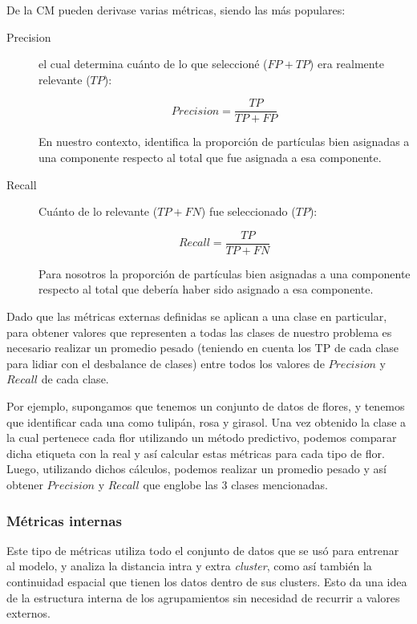 De la \gls{CM} pueden derivase varias métricas, siendo las más populares:

\begin{description}
    \item [Precision] el cual determina cuánto de lo que seleccioné ($FP + TP$) era realmente relevante ($TP$):

    $$Precision = \frac{TP}{TP + FP}$$

    En nuestro contexto, identifica la proporción de partículas bien asignadas a una componente respecto al total que fue asignada a esa componente. 

    \item [Recall] Cuánto de lo relevante ($TP + FN$) fue seleccionado ($TP$):

    $$Recall = \frac{TP}{TP + FN}$$

    Para nosotros la proporción de partículas bien asignadas a una componente respecto al total que debería haber sido asignado a esa componente. 

\end{description}

Dado que las métricas externas definidas se aplican a una clase en particular, para obtener valores que representen a todas las clases de nuestro problema es necesario realizar un promedio pesado (teniendo en cuenta los \gls{TP} de cada clase para lidiar con el desbalance de clases) entre todos los valores de $Precision$ y $Recall$ de cada clase.

Por ejemplo, supongamos que tenemos un conjunto de datos de flores, y tenemos que identificar cada una como tulipán, rosa y girasol. Una vez obtenido la clase a la cual pertenece cada flor utilizando un método predictivo, podemos comparar dicha etiqueta con la real y así calcular estas métricas para cada tipo de flor. Luego, utilizando dichos cálculos, podemos realizar un promedio pesado y así obtener $Precision$ y $Recall$ que englobe las 3 clases mencionadas.


\subsubsection{Métricas internas}

Este tipo de métricas utiliza todo el conjunto de datos que se usó para entrenar al modelo, y analiza  la distancia intra y extra \textit{cluster}, como así también la continuidad espacial que tienen los datos dentro de sus clusters. Esto da una idea de la estructura interna de los agrupamientos sin necesidad de recurrir a valores externos.

